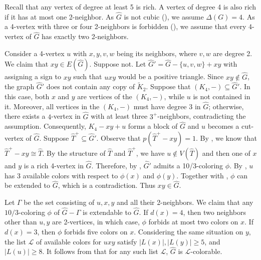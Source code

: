 \documentclass[11pt,a4paper]{article}
\makeatletter
\renewenvironment{proof}[1][\proofname]{\par
	\pushQED{\qed}%
	\normalfont \topsep6\p@\@plus6\p@\relax
	\trivlist
	\item[\hskip\labelsep
	\bfseries
	#1\@addpunct{.}]\ignorespaces
}{%
	\popQED\endtrivlist\@endpefalse
}
\theoremstyle{definition}
\makeatother
\begin{document}
\begin{proof}
	Recall that any vertex of degree at least 5 is rich. A vertex of degree 4 is also rich if it has at most one 2-neighbor. As $\widehat{G}$ is not cubic (), we assume $\Delta(G)=4$. As a 4-vertex with three or four 2-neighbors is forbidden (), we assume that every $4$-vertex of $\widehat{G}$ has exactly two 2-neighbors.	
	
	
	Consider a 4-vertex $u$ with $x, y, v, w$ being its neighbors, where $v,w$ are degree 2. We claim that $xy\in E(\widehat{G})$. Suppose not. Let $\widehat{G}'=\widehat{G}-\{u,v,w\}+xy$ with assigning a sign to $xy$ such that $uxy$ would be a positive triangle. 
	Since $xy\notin \widehat{G}$, the graph $\widehat{G}'$ does not contain any copy of $\widetilde{K}_{2}$. Suppose that $(K_{4},-)\subseteq \widehat{G}'$. In this case, both $x$ and $y$ are vertices of the $(K_{4},-)$, while $u$ is not contained in it. Moreover, all vertices in the $(K_{4},-)$ must have degree $3$ in $\widehat{G}$; otherwise, there exists a $4$-vertex in $\widehat{G}$ with at least three $3^{+}$-neighbors, contradicting the assumption. Consequently, $K_{4}-xy+u$ forms a block of $\widehat{G}$ and $u$ becomes a cut-vertex of $\widehat{G}$. Suppose $\widehat{T}^{+}\subseteq \widehat{G}'$. Observe that $p(\widehat{T}^{+}-xy)=1$. By , we know that $\widehat{T}^{+}-xy\cong \widehat{T}$. By the structure of $\widehat{T}$ and $\widehat{T}^{+}$, we have $u\notin V(\widehat{T})$ and then one of $x$ and $y$ is a rich 4-vertex in $\widehat{G}$.
	Therefore, by , $\widehat{G}'$ admits a 10/3-coloring $\phi$. By , $u$ has 3 available colors with respect to $\phi(x)$ and $\phi(y)$. Together with , $\phi$ can be extended to $\widehat{G}$, which is a contradiction. Thus $xy\in \widehat{G}$. 
	
	Let $\Gamma$ be the set consisting of  $u,x,y$  and all their 2-neighbors. We claim that any $10/3$-coloring $\phi$ of $\widehat{G}-\Gamma$ is extendable to $\widehat{G}$.  If $d(x)=4$, then two neighbors other than $u, y$ are 2-vertices, in which case, $\phi$ forbids at most two colors on $x$.  If $d(x)=3$, then $\phi$ forbids five colors on $x$.  Considering the same situation on $y$, the list $\mathcal{L}$ of available colors for $uxy$ satisfy $|L(x)|, |L(y)|\geq 5$, and $|L(u)|\geq 8$. It follows from   that for any such list $\mathcal{L}$, $\widehat{G}$ is $\mathcal{L}$-colorable.
\end{proof}
\end{document}
